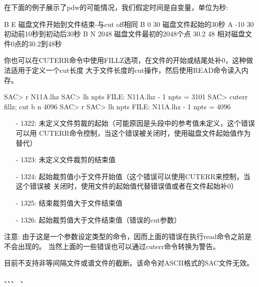 在下面的例子展示了pdw的可能情况，我们假定时间是自变量，单位为秒:
\begin{SACCode}
 B E  磁盘文件开始到文件结束-与cut off相同
 B 0 30  磁盘文件起始的30秒
 A -10 30  初动前10秒到初动后30秒
 B N 2048   磁盘文件最初的2048个点
 30.2 48  相对磁盘文件0点的30.2到48秒
\end{SACCode}

你也可以在CUTERR命令中使用FILLZ选项，在文件的开始或结尾处补0，这种做法适用于定义一个cut长度
大于文件长度的cut操作，然后使用READ命令读入内存。
\begin{SACCode}
SAC> r N11A.lhz
SAC> lh npts
FILE: N11A.lhz - 1
npts = 3101
SAC> cuterr fillz; cut b n 4096
SAC> r
SAC> lh npts
FILE: N11A.lhz - 1
npts = 4096
\end{SACCode}
 
\begin{itemize}
\item[-]1322: 未定义文件剪裁的起始（可能原因是头段中的参考值未定义，这个错误可以用
    CUTERR命令控制，当这个错误被关闭时，使用磁盘文件起始值作为替代）
\item[-]1323: 未定义文件裁剪的结束值
\item[-]1324: 起始裁剪值小于文件开始值（这个错误可以使用CUTERR来控制，当这个错误被
    关闭时，使用文件的起始值代替错误值或者在文件起始补0）
\item[-]1325: 结束裁剪值大于文件结束值
\item[-]1326: 起始裁剪值大于文件结束值（错误的cut参数）
\end{itemize}

注意: 由于这是一个参数设定类型的命令，因而上面的错误在执行read命令之前是不会出现的。
当然上面的一些错误也可以通过cuterr命令转换为警告。

目前不支持非等间隔文件或谱文件的截断。该命令对ASCII格式的SAC文件无效。

、、、
、
